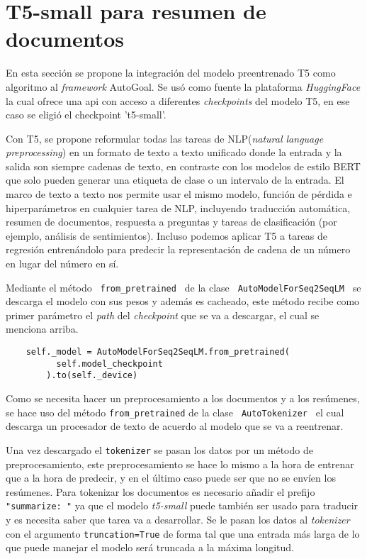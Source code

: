 \section{T5-small para resumen de documentos}
En esta sección se propone la integración del modelo preentrenado T5 como algoritmo al \textit{framework} AutoGoal. Se usó como fuente la plataforma \textit{HuggingFace} la cual ofrece una api con acceso a diferentes \textit{checkpoints} del modelo T5, en ese caso se eligió el checkpoint 't5-small'.

Con T5, se propone reformular todas las tareas de NLP(\textit{natural language preprocessing}) en un formato de texto a texto unificado donde la entrada y la salida son siempre cadenas de texto, en contraste con los modelos de estilo BERT que solo pueden generar una etiqueta de clase o un intervalo de la entrada. El marco de texto a texto nos permite usar el mismo modelo, función de pérdida e hiperparámetros en cualquier tarea de NLP, incluyendo traducción automática, resumen de documentos, respuesta a preguntas y tareas de clasificación (por ejemplo, análisis de sentimientos). Incluso podemos aplicar T5 a tareas de regresión entrenándolo para predecir la representación de cadena de un número en lugar del número en sí.

Mediante el método \texttt{ from\_pretrained } de la clase \texttt{ AutoModelForSeq2SeqLM } se descarga el modelo con sus pesos y además es cacheado, este método recibe como primer parámetro el \textit{path} del \textit{checkpoint} que se va a descargar, el cual se menciona arriba.

\begin{verbatim}
    self._model = AutoModelForSeq2SeqLM.from_pretrained(
          self.model_checkpoint
        ).to(self._device)
\end{verbatim}

Como se necesita hacer un preprocesamiento a los documentos y a los resúmenes, se hace uso del método \texttt{from\_pretrained} de la clase \texttt{ AutoTokenizer } el cual descarga un procesador de texto de acuerdo al modelo que se va a reentrenar.

Una vez descargado el \texttt{tokenizer} se pasan los datos por un método de preprocesamiento, este preprocesamiento se hace lo mismo a la hora de entrenar que a la hora de predecir, y en el último caso puede ser que no se envíen los resúmenes. Para tokenizar los documentos es necesario añadir el prefijo \texttt{"summarize: "} ya que el modelo \textit{t5-small} puede también ser usado para traducir y es necesita saber que tarea va a desarrollar. Se le pasan los datos al \textit{tokenizer} con el argumento \texttt{truncation=True} de forma tal que una entrada más larga de lo que puede manejar el modelo será truncada a la máxima longitud.

